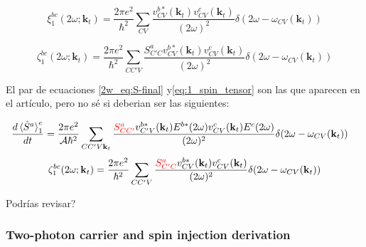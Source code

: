 \documentclass{article}
\newcommand{\kt}{\mathbf{k}_{t}}
\newcommand{\dw}{\delta(2\omega - \omega_{CV}(\kt))}
\begin{document}
\begin{equation}\label{eq:1_carrier_tensor}
\xi^{bc}_{1}(2\omega;\kt) = \frac{2\pi e^{2}}{\hbar^{2}} 
\sum_{CV} \frac{v^{b*}_{CV}(\kt)v^{c}_{CV}(\kt)}{(2\omega)^{2}} \dw
\end{equation}

\begin{equation}\label{eq:1_spin_tensor}
\zeta^{bc}_{1}(2\omega;\kt) = \frac{2\pi e^{2}}{\hbar^{2}} 
\sum_{CC'V} \frac{S^{a}_{C'C}v^{b*}_{CV}(\kt)v^{c}_{CV}(\kt)}{(2\omega)^{2}} \dw
\end{equation}

{\color{blue} 

El par de  ecuaciones \eqref{2w_eq:S-final}
y\eqref{eq:1_spin_tensor} son las que aparecen en el art\'iculo, pero no s\'e si 
deberian ser las siguientes:

\begin{align*}
\frac{d\ev*{\hat{S}^{a}}^{e}_{1}}{dt} &= 
\frac{2\pi e^{2}}{\mathcal{A}\hbar^{2}} \sum_{CC'V\kt} 
\frac{{\color{red}S^{a}_{CC'}}v^{b*}_{C'V}(\kt)E^{b*}(2\omega)v^{c}_{CV}(\kt)E^{c}(2\omega)}
{(2\omega)^{2}}\dw
\end{align*}
\begin{equation*}
\zeta^{bc}_{1}(2\omega;\kt) = \frac{2\pi e^{2}}{\hbar^{2}} 
\sum_{CC'V} \frac{{\color{red}S^{a}_{C'C}}v^{b*}_{CV}(\kt)v^{c}_{CV}(\kt)}{(2\omega)^{2}} 
\dw
\end{equation*}

Podr\'ias revisar?
}

\subsubsection{Two-photon carrier and spin injection derivation}
\end{document}
